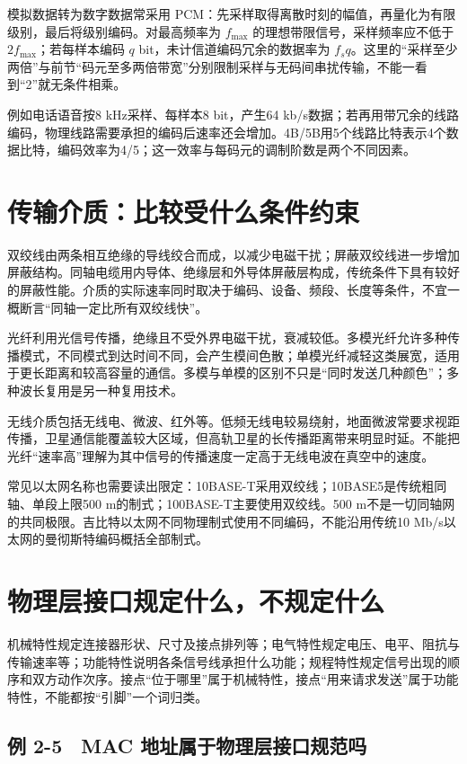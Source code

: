 模拟数据转为数字数据常采用 PCM：先采样取得离散时刻的幅值，再量化为有限级别，最后将级别编码。对最高频率为 \(f_{\max}\) 的理想带限信号，采样频率应不低于 \(2f_{\max}\)；若每样本编码 \(q\) bit，未计信道编码冗余的数据率为 \(f_s q\)。这里的``采样至少两倍''与前节``码元至多两倍带宽''分别限制采样与无码间串扰传输，不能一看到``2''就无条件相乘。

例如电话语音按8 kHz采样、每样本8 bit，产生64 kb/s数据；若再用带冗余的线路编码，物理线路需要承担的编码后速率还会增加。4B/5B用5个线路比特表示4个数据比特，编码效率为4/5；这一效率与每码元的调制阶数是两个不同因素。

\section{传输介质：比较受什么条件约束}\label{CN02-06}

双绞线由两条相互绝缘的导线绞合而成，以减少电磁干扰；屏蔽双绞线进一步增加屏蔽结构。同轴电缆用内导体、绝缘层和外导体屏蔽层构成，传统条件下具有较好的屏蔽性能。介质的实际速率同时取决于编码、设备、频段、长度等条件，不宜一概断言``同轴一定比所有双绞线快''。

光纤利用光信号传播，绝缘且不受外界电磁干扰，衰减较低。多模光纤允许多种传播模式，不同模式到达时间不同，会产生模间色散；单模光纤减轻这类展宽，适用于更长距离和较高容量的通信。多模与单模的区别不只是``同时发送几种颜色''；多种波长复用是另一种复用技术。

无线介质包括无线电、微波、红外等。低频无线电较易绕射，地面微波常要求视距传播，卫星通信能覆盖较大区域，但高轨卫星的长传播距离带来明显时延。不能把光纤``速率高''理解为其中信号的传播速度一定高于无线电波在真空中的速度。

常见以太网名称也需要读出限定：10BASE-T采用双绞线；10BASE5是传统粗同轴、单段上限500 m的制式；100BASE-T主要使用双绞线。500 m不是一切同轴网的共同极限。吉比特以太网不同物理制式使用不同编码，不能沿用传统10 Mb/s以太网的曼彻斯特编码概括全部制式。

\section{物理层接口规定什么，不规定什么}\label{CN02-07}

机械特性规定连接器形状、尺寸及接点排列等；电气特性规定电压、电平、阻抗与传输速率等；功能特性说明各条信号线承担什么功能；规程特性规定信号出现的顺序和双方动作次序。接点``位于哪里''属于机械特性，接点``用来请求发送''属于功能特性，不能都按``引脚''一个词归类。

\subsection{例 2-5　MAC 地址属于物理层接口规范吗}\label{CN02-ex5}

